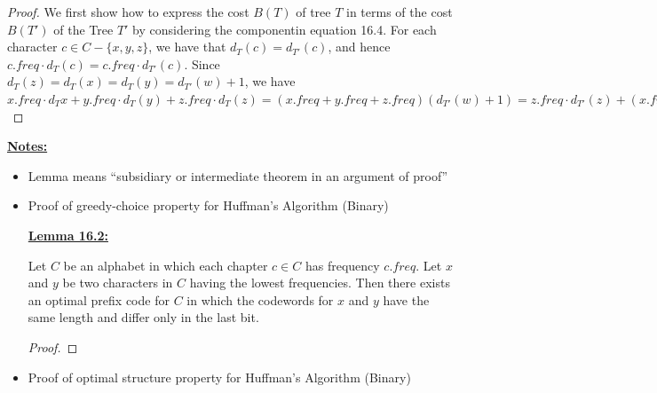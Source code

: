 \documentclass[12pt]{article}
\begin{document}
\begin{enumerate}[1.]
\begin{mdframed}
\begin{itemize}
            \bigskip

            \begin{proof}
            We first show how to express the cost $B(T)$ of tree $T$ in terms of the cost
            $B(T')$ of the Tree $T'$ by considering the componentin equation 16.4.
            For each character $c \in C - \{x,y,z\}$, we have that $d_T(c) = d_{T'}(c)$, and hence
            $c.freq \cdot d_T(c) = c.freq \cdot d_{T'}(c)$. Since $d_T(z) = d_T(x) = d_T(y) = d_{T'}(w) + 1$, we have
            $x.freq \cdot d_T{x} + y.freq \cdot d_T(y) + z.freq \cdot d_T(z) = (x.freq + y.freq +z.freq)(d_{T'}(w) + 1)
            = z.freq \cdot d_{T'}(z) + (x.freq + y.freq + z.freq)$

            \bigskip


            \end{proof}


        \end{itemize}


    \end{mdframed}
    \bigskip

    \underline{\textbf{Notes:}}

    \bigskip

    \begin{itemize}
        \item Lemma means ``subsidiary or intermediate theorem in an argument of proof''
        \item Proof of greedy-choice property for Huffman's Algorithm (Binary)

        \bigskip

        \underline{\textbf{Lemma 16.2:}}

        \bigskip

        Let $C$ be an alphabet in which each chapter $c \in C$ has frequency $c.freq$. Let
        $x$ and $y$ be two characters in $C$ having the lowest frequencies. Then there exists an
        optimal prefix code for $C$ in which the codewords for $x$ and $y$ have the same
        length and differ only in the last bit.

        \bigskip

        \begin{proof}

        \end{proof}
        \item Proof of optimal structure property for Huffman's Algorithm (Binary)

        \bigskip
    \end{itemize}

\end{enumerate}
\end{document}
